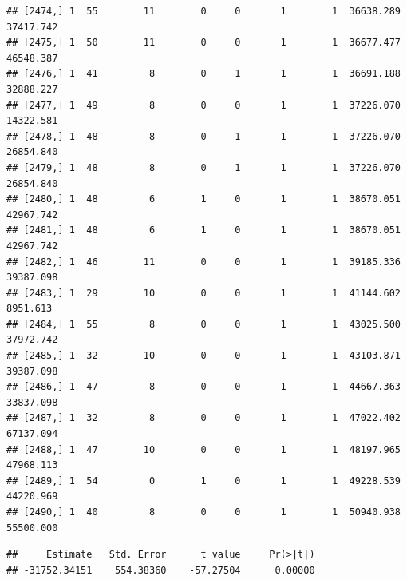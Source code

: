\documentclass[
]{article}
\newenvironment{Shaded}{\begin{snugshade}}{\end{snugshade}}
\newcommand{\AttributeTok}[1]{\textcolor[rgb]{0.13,0.29,0.53}{#1}}
\newcommand{\CommentTok}[1]{\textcolor[rgb]{0.56,0.35,0.01}{\textit{#1}}}
\newcommand{\DecValTok}[1]{\textcolor[rgb]{0.00,0.00,0.81}{#1}}
\newcommand{\FunctionTok}[1]{\textcolor[rgb]{0.13,0.29,0.53}{\textbf{#1}}}
\newcommand{\NormalTok}[1]{#1}
\newcommand{\OtherTok}[1]{\textcolor[rgb]{0.56,0.35,0.01}{#1}}
\newcommand{\SpecialCharTok}[1]{\textcolor[rgb]{0.81,0.36,0.00}{\textbf{#1}}}
\newcommand{\StringTok}[1]{\textcolor[rgb]{0.31,0.60,0.02}{#1}}
\begin{document}
\begin{verbatim}
## [2474,] 1  55        11        0     0       1        1  36638.289  37417.742
## [2475,] 1  50        11        0     0       1        1  36677.477  46548.387
## [2476,] 1  41         8        0     1       1        1  36691.188  32888.227
## [2477,] 1  49         8        0     0       1        1  37226.070  14322.581
## [2478,] 1  48         8        0     1       1        1  37226.070  26854.840
## [2479,] 1  48         8        0     1       1        1  37226.070  26854.840
## [2480,] 1  48         6        1     0       1        1  38670.051  42967.742
## [2481,] 1  48         6        1     0       1        1  38670.051  42967.742
## [2482,] 1  46        11        0     0       1        1  39185.336  39387.098
## [2483,] 1  29        10        0     0       1        1  41144.602   8951.613
## [2484,] 1  55         8        0     0       1        1  43025.500  37972.742
## [2485,] 1  32        10        0     0       1        1  43103.871  39387.098
## [2486,] 1  47         8        0     0       1        1  44667.363  33837.098
## [2487,] 1  32         8        0     0       1        1  47022.402  67137.094
## [2488,] 1  47        10        0     0       1        1  48197.965  47968.113
## [2489,] 1  54         0        1     0       1        1  49228.539  44220.969
## [2490,] 1  40         8        0     0       1        1  50940.938  55500.000
\end{verbatim}

\begin{Shaded}
\end{Shaded}

\begin{verbatim}
##     Estimate   Std. Error      t value     Pr(>|t|) 
## -31752.34151    554.38360    -57.27504      0.00000
\end{verbatim}
\end{document}
